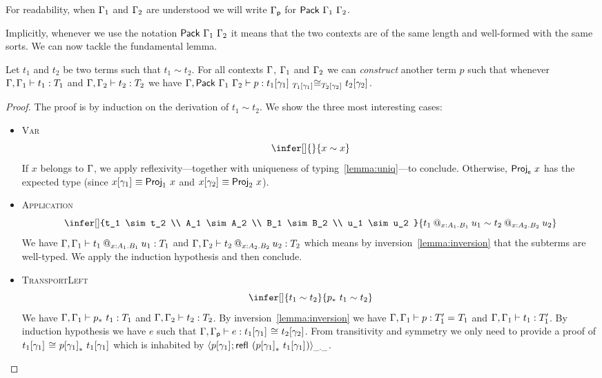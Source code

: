 For readability, when $\Ga_1$ and $\Ga_2$ are understood we will write $\Gp$ for
$\Pack{\Ga_1}{\Ga_2}$.

Implicitly, whenever we use the notation $\Pack{\Ga_1}{\Ga_2}$ it means that
the two contexts are of the same length and well-formed with the same
sorts.
%
We can now tackle the fundamental lemma.

\begin{lemma}
  Let $t_1$ and $t_2$ be two terms such that \(t_1 \sim t_2\).
  For all contexts \(\Ga\), \(\Ga_1\) and \(\Ga_2\) we can \emph{construct}
  another term \(p\) such that whenever $\isterm{\Ga, \Ga_1}{t_1}{T_1}$ and
  $\isterm{\Ga, \Ga_2}{t_2}{T_2}$ we have
  $\isterm{\Ga, \Pack{\Ga_1}{\Ga_2}}
          {p}
          {\Heq{\llift{\gamma}{}{T_1}}
               {\llift{\gamma}{}{t_1}}
               {\rlift{\gamma}{}{T_2}}
               {\rlift{\gamma}{}{t_2}}}$.
\end{lemma}

\begin{proof}
  The proof is by induction on the derivation of $t_1 \sim t_2$. We show
  the three most interesting cases:

  \begin{itemize}
  \item \textsc{Var}
    \[
      \infer[]
        { }
        {x \sim x}
    \]
    If $x$ belongs to $\Ga$, we apply reflexivity---together with uniqueness of
    typing~\eqref{lemma:uniq}---to conclude.
    Otherwise, $\ProjE{x}$ has the expected type (since
    $\llift{\gamma}{}{x} \equiv \ProjO{x}$ and $\rlift{\gamma}{}{x} \equiv \ProjT{x}$).

  \item \textsc{Application}
    \[
      \infer[]
        {t_1 \sim t_2 \\
         A_1 \sim A_2 \\
         B_1 \sim B_2 \\
         u_1 \sim u_2
        }
        {\app{t_1}{x:A_1}{B_1}{u_1} \sim \app{t_2}{x:A_2}{B_2}{u_2}}
    \]
    We have $\isterm{\Ga, \Ga_1}{\app{t_1}{x:A_1}{B_1}{u_1}}{T_1}$ and
    $\isterm{\Ga, \Ga_2}{\app{t_2}{x:A_2}{B_2}{u_2}}{T_2}$ which means by
    inversion~\eqref{lemma:inversion} that the subterms are well-typed.
    We apply the induction hypothesis and then conclude.
  \item \textsc{TransportLeft}
    \[
      \infer[]
        {t_1 \sim t_2}
        {\transpo{p}\ t_1 \sim t_2}
    \]
    We have $\isterm{\Ga, \Ga_1}{\transpo{p}\ t_1}{T_1}$ and
    $\isterm{\Ga, \Ga_2}{t_2}{T_2}$.
    By inversion~\eqref{lemma:inversion} we have
    $\isterm{\Ga, \Ga_1}{p}{\Eq{}{T_1'}{T_1}}$ and
    $\isterm{\Ga, \Ga_1}{t_1}{T_1'}$.
    By induction hypothesis we have $e$ such that
    $\isterm{\Ga, \Gp}{e}{\Heq{}{\llift{\gamma}{}{t_1}}{}{\rlift{\gamma}{}{t_2}}}$.
    From transitivity and symmetry we only need to provide a proof of
    $\Heq{}{\llift{\gamma}{}{t_1}}{}{\transpo{\llift{\gamma}{}{p}}\ \llift{\gamma}{}{t_1}}$ which is inhabited by
    $\pair{\_}{\_}{\llift{\gamma}{}{p}}{\refl{} (\transpo{\llift{\gamma}{}{p}}\ \llift{\gamma}{}{t_1})}$.
  \end{itemize}
\end{proof}

